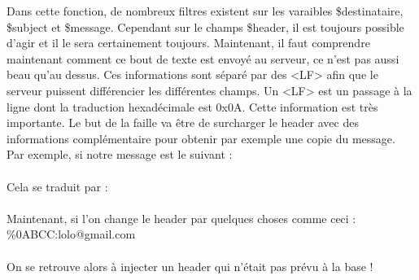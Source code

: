 \documentclass{article}
\begin{document}
Dans cette fonction, de nombreux filtres existent sur les varaibles \$destinataire, \$subject et \$message. Cependant sur le champs \$header, il est toujours possible d'agir et il le sera certainement toujours. Maintenant, il faut comprendre maintenant comment ce bout de texte est envoyé au serveur, ce n'est pas aussi beau qu'au dessus. Ces informations sont séparé par des <LF> afin que le serveur puissent différencier les différentes champs. Un <LF> est un passage à la ligne dont la traduction hexadécimale est 0x0A. Cette information est très importante. Le but de la faille va être de surcharger le header avec des informations complémentaire pour obtenir par exemple une copie du message. Par exemple, si notre message est le suivant :\\
\vspace{0.1cm}\\

Cela se traduit par :\\
\vspace{0.1cm}\\

Maintenant, si l'on change le header par quelques choses comme ceci : \%0ABCC:lolo@gmail.com\\
\vspace{0.1cm}\\

On se retrouve alors à injecter un header qui n'était pas prévu à la base !
\end{document}
